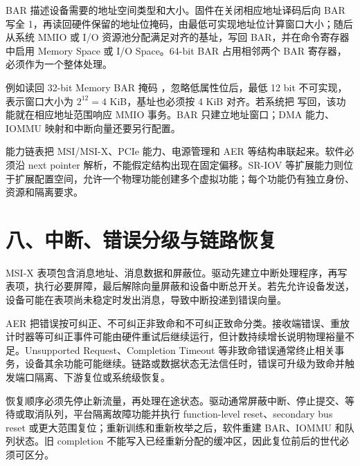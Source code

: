 BAR 描述设备需要的地址空间类型和大小。固件在关闭相应地址译码后向 BAR 写全 1，再读回硬件保留的地址位掩码，由最低可实现地址位计算窗口大小；随后从系统 MMIO 或 I/O 资源池分配满足对齐的基址，写回 BAR，并在命令寄存器中启用 Memory Space 或 I/O Space。64-bit BAR 占用相邻两个 BAR 寄存器，必须作为一个整体处理。

例如读回 32-bit Memory BAR 掩码 ，忽略低属性位后，最低 12 bit 不可实现，表示窗口大小为 $2^{12}=4$ KiB，基址也必须按 4 KiB 对齐。若系统把  写回，该功能就在相应地址范围响应 MMIO 事务。BAR 只建立地址窗口；DMA 能力、IOMMU 映射和中断向量还要另行配置。

能力链表把 MSI/MSI-X、PCIe 能力、电源管理和 AER 等结构串联起来。软件必须沿 next pointer 解析，不能假定结构出现在固定偏移。SR-IOV 等扩展能力则位于扩展配置空间，允许一个物理功能创建多个虚拟功能；每个功能仍有独立身份、资源和隔离要求。

\section{八、中断、错误分级与链路恢复}

MSI-X 表项包含消息地址、消息数据和屏蔽位。驱动先建立中断处理程序，再写表项，执行必要屏障，最后解除向量屏蔽和设备中断总开关。若先允许设备发送，设备可能在表项尚未稳定时发出消息，导致中断投递到错误向量。

AER 把错误按可纠正、不可纠正非致命和不可纠正致命分类。接收端错误、重放计时器等可纠正事件可能由硬件重试后继续运行，但计数持续增长说明物理裕量不足。Unsupported Request、Completion Timeout 等非致命错误通常终止相关事务，设备其余功能可能继续。链路或数据状态无法信任时，错误可升级为致命并触发端口隔离、下游复位或系统级恢复。

恢复顺序必须先停止新流量，再处理在途状态。驱动通常屏蔽中断、停止提交、等待或取消队列，平台隔离故障功能并执行 function-level reset、secondary bus reset 或更大范围复位；重新训练和重新枚举之后，软件重建 BAR、IOMMU 和队列状态。旧 completion 不能写入已经重新分配的缓冲区，因此复位前后的世代必须可区分。




























